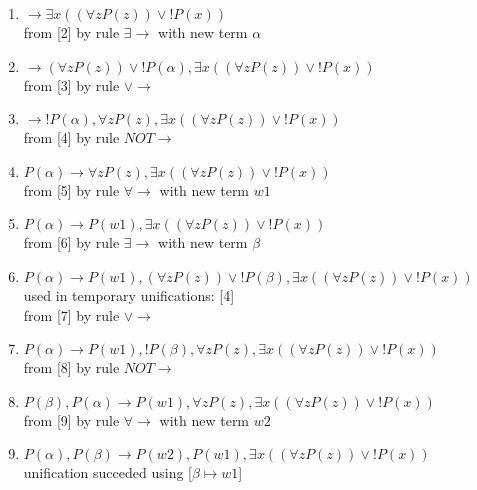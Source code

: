 \begin{enumerate}
\item $ \rightarrow   \exists  x (( \forall  z P(z))  \vee  !P(x))$\\
 from [2] by rule $\exists \rightarrow $ with new term $\alpha$
\item $ \rightarrow  ( \forall  z P(z))  \vee  !P(\alpha),  \exists  x (( \forall  z P(z))  \vee  !P(x))$\\
 from [3] by rule $ \vee \rightarrow $
\item $ \rightarrow  !P(\alpha),  \forall  z P(z),  \exists  x (( \forall  z P(z))  \vee  !P(x))$\\
 from [4] by rule $NOT\rightarrow $
\item $P(\alpha) \rightarrow   \forall  z P(z),  \exists  x (( \forall  z P(z))  \vee  !P(x))$\\
 from [5] by rule $\forall \rightarrow $ with new term $w1$
\item $P(\alpha) \rightarrow  P(w1),  \exists  x (( \forall  z P(z))  \vee  !P(x))$\\
 from [6] by rule $\exists \rightarrow $ with new term $\beta$
\item $P(\alpha) \rightarrow  P(w1), ( \forall  z P(z))  \vee  !P(\beta),  \exists  x (( \forall  z P(z))  \vee  !P(x))$\\
  used in temporary unifications: [4]\\
 from [7] by rule $ \vee \rightarrow $
\item $P(\alpha) \rightarrow  P(w1), !P(\beta),  \forall  z P(z),  \exists  x (( \forall  z P(z))  \vee  !P(x))$\\
 from [8] by rule $NOT\rightarrow $
\item $P(\beta), P(\alpha) \rightarrow  P(w1),  \forall  z P(z),  \exists  x (( \forall  z P(z))  \vee  !P(x))$\\
 from [9] by rule $\forall \rightarrow $ with new term $w2$
\item $P(\alpha), P(\beta) \rightarrow  P(w2), P(w1),  \exists  x (( \forall  z P(z))  \vee  !P(x))$\\ 
 unification succeded using [$\beta \mapsto w1$]
\end{enumerate}
